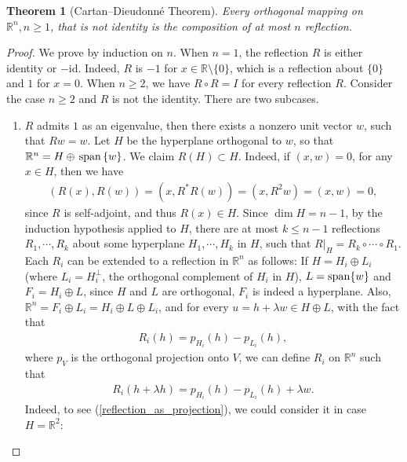 \documentclass[11pt]{book}
\newtheorem{theorem}{Theorem}[chapter]
\theoremstyle{definition}
\numberwithin{equation}{chapter}
\begin{document}
\begin{subappendices}
\medskip

\begin{theorem}[Cartan–Dieudonné Theorem]{\rm \cite{35}} \label{Cartan_Dieudonne}
Every orthogonal mapping on $\mathbb{R}^n, n \geq 1$, that is not identity is the composition of at most $n$ reflection.
\end{theorem}
\begin{proof}
We prove by induction on $n$. When $n = 1$, the reflection $R$ is either identity or $-$id. Indeed, $R$ is $-1$ for $x \in \mathbb{R} \setminus \{0\}$, which is a reflection about $\{0\}$ and $1$ for $x = 0$. When $n \geq 2$, we have $R \circ R = I$ for every reflection $R$. Consider the case $n \geq 2$ and $R$ is not the identity. There are two subcases.
\begin{enumerate}[label=(\alph*)]
    \item $R$ admits $1$ as an eigenvalue, then there exists a nonzero unit vector $w$, such that $Rw = w$. Let $H$ be the hyperplane orthogonal to $w$, so that $\mathbb{R}^n = H \oplus \,{\rm span}\,\{w\}$. We claim $R(H) \subset H$. Indeed, if $(x, w) = 0$, for any $x \in H$, then we have 
    \begin{align*}
        (R(x), R(w)) = (x, R^* R(w)) = (x, R^2 w) = (x, w) = 0,
    \end{align*}
    since $R$ is self-adjoint, and thus $R(x) \in H$. Since $\dim  H = n - 1$, by the induction hypothesis applied to $H$, there are at most $k \leq n - 1$ reflections $R_1, \cdots, R_k$ about some hyperplane $H_1, \cdots, H_k$ in $H$, such that $R|_H = R_k \circ \cdots \circ R_1$. Each $R_i$ can be extended to a reflection in $\mathbb{R}^n$ as follows: If $H = H_i \oplus L_i$ (where $L_i = H_i^\bot$, the orthogonal complement of $H_i$ in $H$), $L = {\rm span}\{w\}$ and $F_i = H_i \oplus L$, since $H$ and $L$ are orthogonal, $F_i$ is indeed a hyperplane. Also, $\mathbb{R}^n = F_i \oplus L_i = H_i \oplus L \oplus L_i$, and for every $u = h + \lambda w \in H \oplus L$, with the fact that
    \begin{align}\label{reflection_as_projection}
        R_i(h) = p_{H_i}(h) - p_{L_i}(h),
    \end{align}
    where $p_{V}$ is the orthogonal projection onto $V$, we can define $R_i$ on $\mathbb{R}^n$ such that 
    \begin{align*}
        R_i(h + \lambda h) = p_{H_i}(h) - p_{L_i}(h) + \lambda w.
    \end{align*}
    Indeed, to see (\ref{reflection_as_projection}), we could consider it in case $H = \mathbb{R}^2$:\\

\end{enumerate}
\end{proof}
\end{subappendices}
\end{document}
